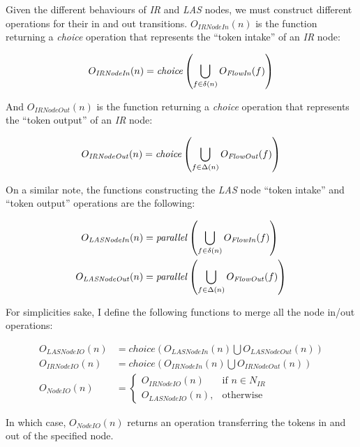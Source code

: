 \begin{definition}
	Given the different behaviours of \emph{IR} and \emph{LAS} nodes, we must construct different operations for their in and out transitions. \(O_\mathit{IRNodeIn}(n)\) is the function returning a \emph{choice} operation that represents the \enquote{token intake} of an \emph{IR} node:
	
	\begin{equation*}
		O_\mathit{IRNodeIn}(n) = \mathit{choice}\left(\bigcup_{f \in \delta(n)} O_\mathit{FlowIn}(f)\right)
	\end{equation*}
	
	And \(O_\mathit{IRNodeOut}(n)\) is the function returning a \emph{choice} operation that represents the \enquote{token output} of an \emph{IR} node:

	\begin{equation*}
		O_\mathit{IRNodeOut}(n) = \mathit{choice}\left(\bigcup_{f \in \Delta(n)} O_\mathit{FlowOut}(f)\right)
	\end{equation*}

	On a similar note, the functions constructing the \emph{LAS} node \enquote{token intake} and \enquote{token output} operations are the following:
	
	\begin{align*}
		O_\mathit{LASNodeIn}(n) &= \mathit{parallel}\left(\bigcup_{f \in \delta(n)} O_\mathit{FlowIn}(f)\right)\\
		O_\mathit{LASNodeOut}(n) &= \mathit{parallel}\left(\bigcup_{f \in \Delta(n)} O_\mathit{FlowOut}(f)\right)
	\end{align*}

	For simplicities sake, I define the following functions to merge all the node in/out operations:

	\begin{align*}
		O_\mathit{LASNodeIO}(n) &= \mathit{choice}\left(O_\mathit{LASNodeIn}(n) \bigcup O_\mathit{LASNodeOut}(n)\right)\\
		O_\mathit{IRNodeIO}(n) &= \mathit{choice}\left(O_\mathit{IRNodeIn}(n) \bigcup O_\mathit{IRNodeOut}(n)\right)\\
		O_\mathit{NodeIO}(n) &= 
		\begin{cases}
			O_\mathit{IRNodeIO}(n) & \text{if } n \in N_{IR} \\
			O_\mathit{LASNodeIO}(n), & \text{otherwise}
		\end{cases}
	\end{align*}

	In which case, \(O_\mathit{NodeIO}(n)\) returns an operation transferring the tokens in and out of the specified node. 

\end{definition}


